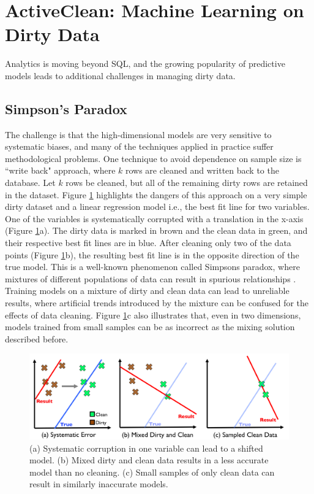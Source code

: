 \section{ActiveClean: Machine Learning on Dirty Data}
Analytics is moving beyond SQL, and the growing popularity of predictive models \cite{bdas, alexandrov2014stratosphere, crotty2014tupleware, hellerstein2012madlib} leads to additional challenges in managing dirty data.

\subsection{Simpson's Paradox}
The challenge is that the high-dimensional models are very sensitive to systematic biases, and many of the techniques applied in practice suffer methodological problems.
One technique to avoid dependence on sample size is ``write back" approach, where $k$ rows are cleaned and written back to the database.
Let $k$ rows be cleaned, but all of the remaining dirty rows are retained in the dataset.
Figure \ref{update-arch1} highlights the dangers of this approach on a very simple dirty dataset and a linear regression model i.e., the best fit line for two variables. 
One of the variables is systematically corrupted with a translation in the x-axis (Figure \ref{update-arch1}a).
The dirty data is marked in brown and the clean data in green, and their respective best fit lines are in blue.
After cleaning only two of the data points (Figure \ref{update-arch1}b), the resulting best fit line is in the opposite direction of the true model.
This is a well-known phenomenon called Simpsons paradox, where mixtures of different populations of data can result in spurious relationships \cite{simpson1951interpretation}.
Training models on a mixture of dirty and clean data can lead to unreliable results, where artificial trends introduced by the mixture can be confused for the effects of data cleaning.
Figure \ref{update-arch1}c also illustrates that, even in two dimensions, models trained from small samples can be as incorrect as the mixing solution described before.

\begin{figure}[ht!]
\centering
 \includegraphics[width=0.6\columnwidth]{figs/update-arch.png}
 \caption{(a) Systematic corruption in one variable can lead to a shifted model. 
 (b) Mixed dirty and clean data results in a less accurate model than no cleaning.
(c) Small samples of only clean data can result in similarly inaccurate models. \label{update-arch1}}
\end{figure}

